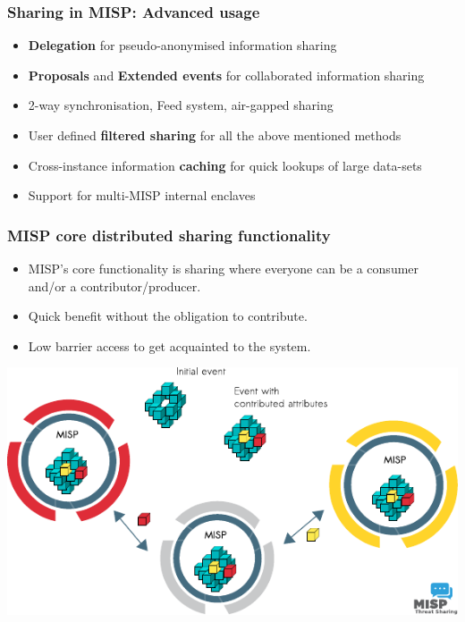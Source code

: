 \begin{frame}
\frametitle{Sharing in MISP: Advanced usage}
    \begin{itemize}
        \item {\bf Delegation} for pseudo-anonymised information sharing
        \item {\bf Proposals} and {\bf Extended events} for collaborated information sharing
        \item 2-way synchronisation, Feed system, air-gapped sharing
        \item User defined {\bf filtered sharing} for all the above mentioned methods
        \item Cross-instance information {\bf caching} for quick lookups of large data-sets
        \item Support for multi-MISP internal enclaves
    \end{itemize}
\end{frame}

\begin{frame}
\frametitle{MISP core distributed sharing functionality}
    \begin{itemize}
        \item MISP's core functionality is sharing where everyone can be a consumer and/or a contributor/producer.
        \item Quick benefit without the obligation to contribute.
        \item Low barrier access to get acquainted to the system.
    \end{itemize}
    \includegraphics[scale=0.9]{misp-distributed.pdf}
\end{frame}



